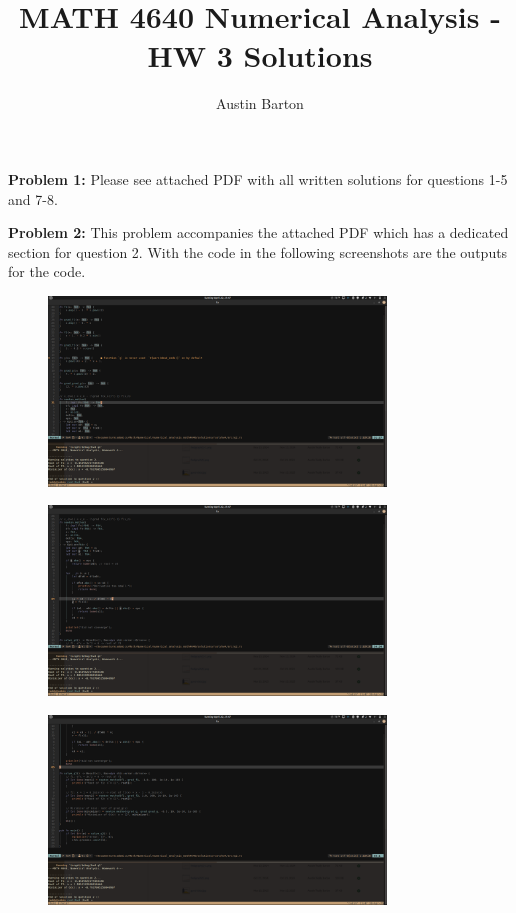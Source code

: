 \documentclass[12pt, letterpaper]{article}
\title{MATH 4640 Numerical Analysis - HW 3 Solutions}
\author{Austin Barton}
\theoremstyle{nonumberplain}
\begin{document}
\maketitle

\vspace{2em}

\hspace{18pt}\textbf{Problem 1:} \medskip
Please see attached PDF with all written solutions for questions 1-5 and 7-8.

\hspace{18pt}\textbf{Problem 2:} \medskip
This problem accompanies the attached PDF which has a dedicated section for question 2. With the code in the following screenshots are the outputs for the code.

\begin{figure}[!htbp]
	\centering
	\includegraphics[width=0.8\textwidth]{numhw4q2-1.png}
\end{figure}
\begin{figure}[!htbp]
	\centering
	\includegraphics[width=0.8\textwidth]{numhw4q2-2.png}
\end{figure}
\begin{figure}[!htbp]
	\centering
	\includegraphics[width=0.8\textwidth]{numhw4q2-3.png}
\end{figure}
\end{document}
